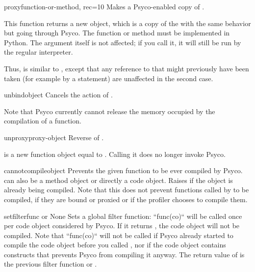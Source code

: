 \documentclass{manual}
\begin{document}
\begin{funcdesc}{proxy}{function-or-method, rec=10}
  Makes a Psyco-enabled copy of .

  This function returns a new object, which is a copy of the  with the same behavior but going through Psyco.  The function or method must be implemented in Python.  The argument itself is not affected; if you call it, it will still be run by the regular interpreter.

  Thus,  is similar to , except that any reference to  that might previously have been taken (for example by a  statement) are unaffected in the second case.
\end{funcdesc}

\begin{funcdesc}{unbind}{object}
  Cancels the action of .

  Note that Psyco currently cannot release the memory occupied by the compilation of a function.
\end{funcdesc}

\begin{funcdesc}{unproxy}{proxy-object}
  Reverse of .

   is a new function object equal to .  Calling it does no longer invoke Psyco.
\end{funcdesc}

\begin{funcdesc}{cannotcompile}{object}
  Prevents the given function to be ever compiled by Psyco.   can also be a method object or directly a code object.  Raises  if the object is already being compiled.  Note that this does not prevent functions called by  to be compiled, if they are bound or proxied or if the profiler chooses to compile them.
\end{funcdesc}

\begin{funcdesc}{setfilter}{func or None}
  Sets a global filter function: ``func(co)`` will be called once per code object  considered by Psyco.  If it returns , the code object will not be compiled.  Note that ``func(co)`` will not be called if Psyco already started to compile the code object before you called , nor if the code object contains constructs that prevents Psyco from compiling it anyway.  The return value of  is the previous filter function or .
\end{funcdesc}
\end{document}
